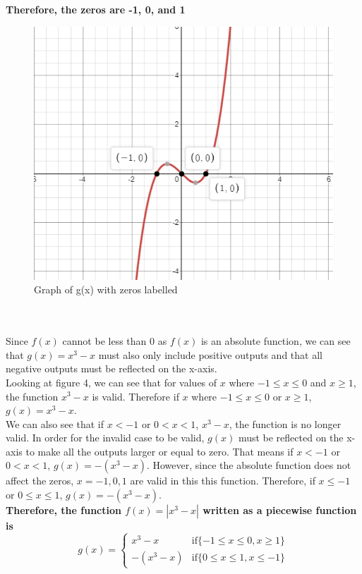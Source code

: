 \documentclass[12pt]{book}
\begin{document}
\begin{enumerate}
\begin{minipage}{.5\textwidth}
    \textbf{Therefore, the zeros are -1, 0, and 1}\\
    \end{minipage}
    \begin{minipage}{.5\textwidth}
    \begin{figure}[H]
    \centering
    \includegraphics[width=1\textwidth]{Q8GraphLABEL.png}
    \caption{Graph of g(x) with zeros labelled}
    \end{figure}
\end{minipage}\\\\

Since $f(x)$ cannot be less than 0 as $f(x)$ is an absolute function, we can see that $g(x) = x^3 - x$ must also only include positive outputs and that all negative outputs must be reflected on the x-axis.\\

Looking at figure 4, we can see that for values of $x$ where $-1 \leq x \leq 0$ and $x \geq 1$, the function $x^3 - x$ is valid. Therefore if $x$ where $-1 \leq x \leq 0$ or $x \geq 1$, $g(x) = x^3 - x$.\\

We can also see that if $x < -1$ or $0 < x < 1$, $x^3 - x$, the function is no longer valid. In order for the invalid case to be valid, $g(x)$ must be reflected on the x-axis to make all the outputs larger or equal to zero. That means if $x < -1$ or $0 < x < 1$, $g(x) = -(x^3 - x)$. However, since the absolute function does not affect the zeros, $x = -1, 0, 1$ are valid in this this function. Therefore, if $x \leq -1$ or $0 \leq x \leq 1$, $g(x) = -(x^3 - x)$.\\

\textbf{Therefore, the function $f(x) = |x^3-x|$ written as a piecewise function is}
$$g(x) =
\begin{cases}
    x^3 - x & \text{if} \{-1 \leq x \leq 0, x \geq 1\} \\
    -(x^3 - x) & \text{if} \{0 \leq x \leq 1, x \leq -1\}
\end{cases}$$

\newpage

\end{enumerate}
\end{document}
